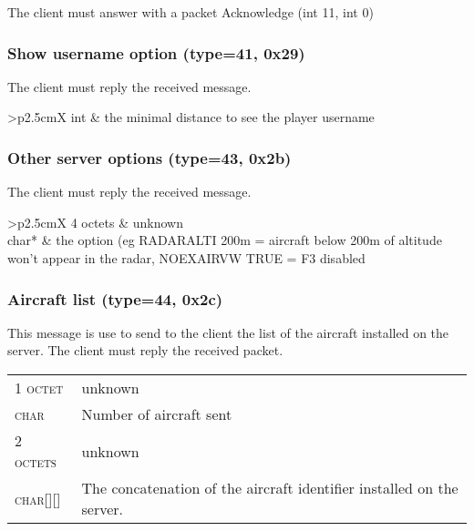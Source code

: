 \documentclass{article}
\newcommand{\gray}{\rowcolor[gray]{.92}}
\begin{document}
\vspace{0.2cm}
The client must answer with a packet Acknowledge (int 11, int 0)


\vspace{0.4cm}
\subsubsection{Show username option (type=41, 0x29)}
The client must reply the received message.\\
\begin{tabularx}{\linewidth}{>{\raggedleft\scshape\small}p{2.5cm}X}
int & the minimal distance to see the player username\\
\end{tabularx}


\vspace{0.4cm}
\subsubsection{Other server options (type=43, 0x2b)}
The client must reply the received message.\\
\begin{tabularx}{\linewidth}{>{\raggedleft\scshape\small}p{2.5cm}X}
 4 octets & unknown\\
\gray  char* & the option (eg RADARALTI 200m = aircraft below 200m of altitude won't appear in the radar, NOEXAIRVW TRUE = F3 disabled\\
\end{tabularx}


\vspace{0.4cm}
\subsubsection{Aircraft list (type=44, 0x2c)}
This message is use to send to the client the list of the aircraft installed on the server. The client must reply the received packet.\\

\begin{tabularx}{\linewidth}{>{\raggedleft\scshape\small}p{2.5cm}X}
 1 octet & unknown\\
\gray  char & Number of aircraft sent\\
2 octets & unknown\\
\gray char[][] & The concatenation of the aircraft identifier installed on the server.
\end{tabularx}

\clearpage
\end{document}
